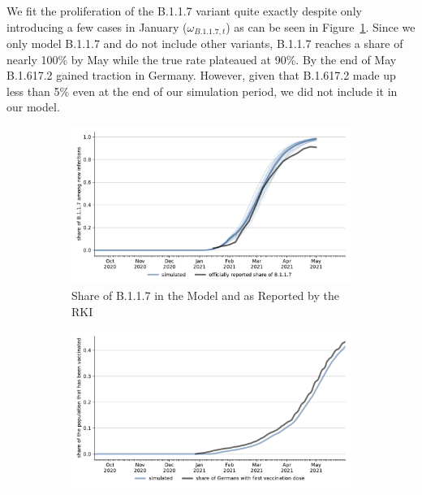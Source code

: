 \FloatBarrier

We fit the proliferation of the B.1.1.7 variant quite exactly despite only introducing a
few cases in January ($\omega_{B.1.1.7,t}$) as can be seen in
Figure~\ref{fig:fit_share_b117}. Since we only model B.1.1.7 and do not include other
variants, B.1.1.7 reaches a share of nearly 100\% by May while the true rate plateaued
at 90\%. By the end of May B.1.617.2 gained traction in Germany. However, given that
B.1.617.2 made up less than 5\% even at the end of our simulation period, we did not
include it in our model.

\begin{figure}[ht]
    \centering

    \begin{subfigure}[b]{0.425\textwidth}   %
        \centering
        \includegraphics[width=\textwidth]{figures/results/figures/scenario_comparisons/combined_fit/full_share_b117_with_single_runs}
        \caption{Share of B.1.1.7 in the Model and as Reported by the RKI}
        \label{fig:fit_share_b117}
    \end{subfigure}
    \hfill
    \begin{subfigure}[b]{0.425\textwidth}    %
        \centering
        \includegraphics[width=\textwidth]{figures/results/figures/scenario_comparisons/combined_fit/full_ever_vaccinated}

\end{subfigure}
\end{figure}
